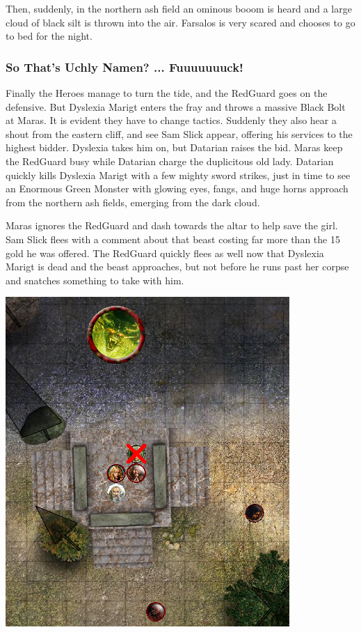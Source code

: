 Then, suddenly, in the northern ash field an ominous booom is heard and a large cloud of black silt is thrown into the air. Farsalos is very scared and chooses to go to bed for the night.

\subsubsection*{So That's Uchly Namen? ... Fuuuuuuuck!}
Finally the Heroes manage to turn the tide, and the RedGuard goes on the defensive. But Dyslexia Marigt enters the fray and throws a massive Black Bolt at Maras. It is evident they have to change tactics. Suddenly they also hear a shout from the eastern cliff, and see Sam Slick appear, offering his services to the highest bidder. Dyslexia takes him on, but Datarian raises the bid.
Maras keep the RedGuard busy while Datarian charge the duplicitous old lady. Datarian quickly kills Dyslexia Marigt with a few mighty sword strikes, just in time to see an Enormous Green Monster with glowing eyes, fangs, and huge horns approach from the northern ash fields, emerging from the dark cloud.

Maras ignores the RedGuard and dash towards the altar to help save the girl. Sam Slick flees with a comment about that beast costing far more than the 15 gold he was offered. The RedGuard quickly flees as well now that Dyslexia Marigt is dead and the beast approaches, but not before he runs past her corpse and snatches something to take with him.

\begin{center}
\vspace{0.5 cm}
\includegraphics[width=0.7\linewidth]{./figs/playthrough/summoning-demon.png}
\vspace{0.5 cm}
\end{center}

